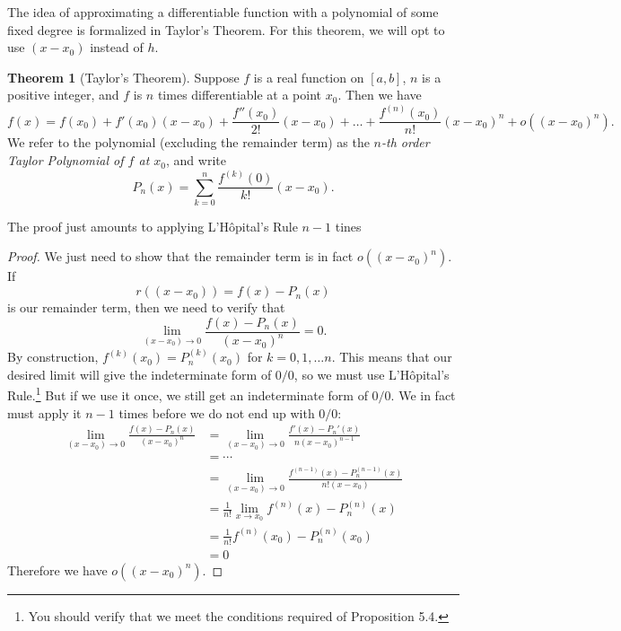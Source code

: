 \documentclass{article}
\theoremstyle{definition}
\newtheorem{theorem}{Theorem}[section]
\begin{document}
The idea of approximating a differentiable function with a polynomial of some fixed degree is formalized in Taylor's Theorem. For this theorem, we will opt to use $ (x-x_0) $ instead of $ h $.
\begin{theorem}[Taylor's Theorem]
Suppose $ f $ is a real function on $ [a,b] $, $ n $ is a positive integer, and $ f $ is $ n $ times differentiable at a point $ x_0 $. Then we have $$ f(x)=f(x_0)+f'(x_0)(x-x_0)+\frac{f''(x_0)}{2!}(x-x_0)+\ldots+\frac{f^{(n)}(x_0)}{n!}(x-x_0)^n+o((x-x_0)^n).$$ We refer to the polynomial (excluding the remainder term) as the \textit{\color{red}$ n $-th order Taylor Polynomial of $ f $ at $ x_0 $}, and write $$ P_n(x)=\sum_{k=0}^{n}\frac{f^{(k)}(0)}{k!}(x-x_0) .$$
\end{theorem}
The proof just amounts to applying L'H\^{o}pital's Rule $ n-1 $ tines
\begin{proof}
We just need to show that the remainder term is in fact $ o((x-x_0)^n) $. If $$ r((x-x_0))=f(x)-P_n(x) $$ is our remainder term, then we need to verify that $$ \lim\limits_{(x-x_0)\to 0}\frac{f(x)-P_n(x)}{(x-x_0)^n}=0.$$ By construction, $ f^{(k)}(x_0)=P_n^{(k)}(x_0) $ for $ k=0,1,\ldots n $. This means that our desired limit will give the indeterminate form of $ 0/0 $, so we must use L'H\^{o}pital's Rule.\footnote{You should verify that we meet the conditions required of Proposition 5.4.} But if we use it once, we still get an indeterminate form of $ 0/0 $. We in fact must apply it $ n-1 $ times before we do not end up with $ 0/0 $:
\begin{align*}
\lim\limits_{(x-x_0)\to 0}\frac{f(x)-P_n(x)}{(x-x_0)^n}&=\lim\limits_{(x-x_0)\to 0}\frac{f'(x)-P_n'(x)}{n(x-x_0)^{n-1}}\\
&=\cdots\\
&=\lim\limits_{(x-x_0)\to 0}\frac{f^{(n-1)}(x)-P_n^{(n-1)}(x)}{n!(x-x_0)}\\
&=\frac{1}{n!}\lim\limits_{x\to x_0}{f^{(n)}(x)-P_n^{(n)}(x)}\\
&=\frac{1}{n!}f^{(n)}(x_0)-P_n^{(n)}(x_0)\\
&=0
\end{align*}
Therefore we have  $ o((x-x_0)^n) $. 
\end{proof}
\end{document}
